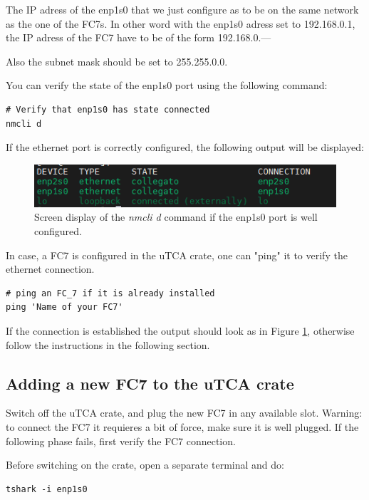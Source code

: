\documentclass[10pt,a4paper]{article}
\begin{document}
The IP adress of the enp1s0 that we just configure as to be on the same network as the one of the FC7s. In other word with the enp1s0 adress set to 192.168.0.1, the IP adress of the FC7 have to be of the form 192.168.0.---

Also the subnet mask should be set to 255.255.0.0.

You can verify the state of the enp1s0 port using the following command:
\begin{framed}
\begin{verbatim}
# Verify that enp1s0 has state connected
nmcli d  
\end{verbatim}
\end{framed}
If the ethernet port is correctly configured, the following output will be displayed:
\begin{figure}[h!]
\centering
 \includegraphics[width=0.6\linewidth]{Nmcli_output.png} 
  \caption{Screen display of the \emph{nmcli d} command if the enp1s0 port is well configured.}
  \label{GoodPing}
\end{figure}

In case, a FC7 is configured in the uTCA crate, one can "ping" it to verify the ethernet connection.
\begin{framed}
\begin{verbatim}
# ping an FC_7 if it is already installed
ping 'Name of your FC7'  
\end{verbatim}
\end{framed}
If the connection is established the output should look as in Figure \ref{GoodPing}, otherwise follow the instructions in the following section.


\subsection{Adding a new FC7 to the uTCA crate}
Switch off the uTCA crate, and plug the new FC7 in any available slot. Warning: to connect the FC7 it requieres a bit of force, make sure it is well plugged. If the following phase fails, first verify the FC7 connection.

Before switching on the crate, open a separate terminal and do:

\begin{framed}
\begin{verbatim}
tshark -i enp1s0  
\end{verbatim}
\end{framed}
\end{document}
